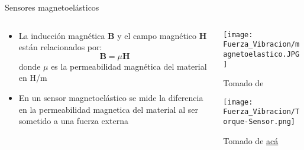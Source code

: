 \documentclass[aspectratio=169]{beamer}
\begin{document}
\begin{frame}{Sensores magnetoelásticos}
    \begin{columns}[c, onlytextwidth]
        \begin{column}{0.6\textwidth}
            \begin{itemize}
                \item La inducción magnética $\mathbf{B}$ y el campo magnético $\mathbf{H}$ están relacionados por:
                \begin{equation*}
                    \mathbf{B} = \mu \mathbf{H}
                \end{equation*}
                donde $\mu$ es la permeabilidad magnética del material en \si{\henry/\meter}
                \item En un sensor magnetoelástico se mide la diferencia en la permeabilidad magnetica del material al ser sometido a una fuerza externa

            \end{itemize}
        \end{column}
        \begin{column}{0.40\textwidth}
            \centering
            \texttt{[image: Fuerza\_Vibracion/magnetoelastico.JPG]}
            
            \tiny{Tomado de \cite{pallas2012sensors}}
            
            \texttt{[image: Fuerza\_Vibracion/Torque-Sensor.png]}
            
            \tiny{Tomado de \href{https://www.methodesensor.com/industries/industrial/torque-sensing/}{acá}}
        \end{column}
    \end{columns}
\end{frame}
\end{document}
